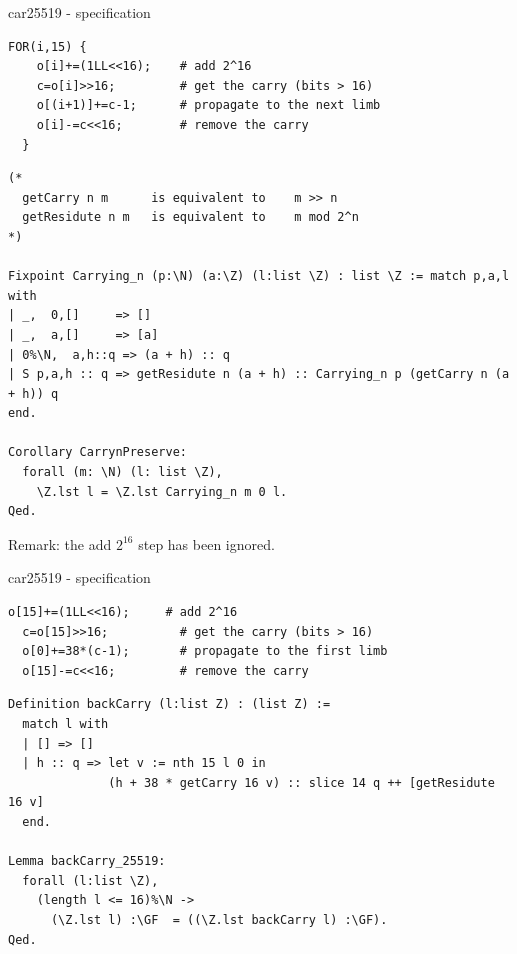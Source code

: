 \documentclass[8pt]{beamer}
\begin{document}
\begin{frame}[fragile]{car25519 - specification}
  \begin{center}

\begin{lstlisting}[language=cnacl, caption=car25519 | propagation, label=cod:languageC151]
  FOR(i,15) {
    o[i]+=(1LL<<16);    # add 2^16
    c=o[i]>>16;         # get the carry (bits > 16)
    o[(i+1)]+=c-1;      # propagate to the next limb
    o[i]-=c<<16;        # remove the carry
  }
\end{lstlisting}

\begin{lstlisting}[language=Coq, caption=car25519 | Proofs of correctness, label=cod:languageC152]
(*
  getCarry n m      is equivalent to    m >> n
  getResidute n m   is equivalent to    m mod 2^n
*)

Fixpoint Carrying_n (p:\N) (a:\Z) (l:list \Z) : list \Z := match p,a,l with
| _,  0,[]     => []
| _,  a,[]     => [a]
| 0%\N,  a,h::q => (a + h) :: q
| S p,a,h :: q => getResidute n (a + h) :: Carrying_n p (getCarry n (a + h)) q
end.

Corollary CarrynPreserve:
  forall (m: \N) (l: list \Z),
    \Z.lst l = \Z.lst Carrying_n m 0 l.
Qed.
\end{lstlisting}

Remark: the add $2^{16}$ step has been ignored.
  \end{center}
\end{frame}


%
%

\begin{frame}[fragile]{car25519 - specification}
  \begin{center}

\begin{lstlisting}[language=cnacl, caption=car25519 | back, label=cod:languageC161]
  o[15]+=(1LL<<16);     # add 2^16
  c=o[15]>>16;          # get the carry (bits > 16)
  o[0]+=38*(c-1);       # propagate to the first limb
  o[15]-=c<<16;         # remove the carry
\end{lstlisting}

\begin{lstlisting}[language=Coq, caption=car25519 | Proofs of correctness, label=cod:languageC162]
Definition backCarry (l:list Z) : (list Z) :=
  match l with
  | [] => []
  | h :: q => let v := nth 15 l 0 in
              (h + 38 * getCarry 16 v) :: slice 14 q ++ [getResidute 16 v]
  end.

Lemma backCarry_25519:
  forall (l:list \Z),
    (length l <= 16)%\N ->
      (\Z.lst l) :\GF  = ((\Z.lst backCarry l) :\GF).
Qed.
\end{lstlisting}

  \end{center}
\end{frame}
\end{document}
